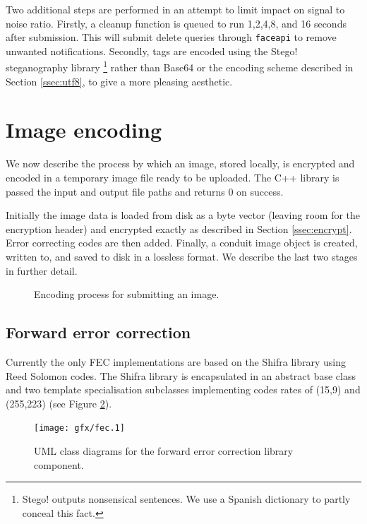 Two additional steps are performed in an attempt to limit impact on signal to noise ratio. Firstly, a cleanup function is queued to run 1,2,4,8, and 16 seconds after submission. This will submit delete queries through {\tt faceapi} to remove unwanted notifications. Secondly, tags are encoded using the Stego! steganography library \footnote{Stego! outputs nonsensical sentences. We use a Spanish dictionary to partly conceal this fact.} rather than Base64 or the encoding scheme described in Section \ref{ssec:utf8}, to give a more pleasing aesthetic.


\FloatBarrier
\section{Image encoding}
\label{sec:img-sub}

We now describe the process by which an image, stored locally, is encrypted and encoded in a temporary image file ready to be uploaded. The C++ library is passed the input and output file paths and returns 0 on success.

Initially the image data is loaded from disk as a byte vector (leaving room for the encryption header) and encrypted exactly as described in Section \ref{ssec:encrypt}. Error correcting codes are then added. Finally, a conduit image object is created, written to, and saved to disk in a lossless format. We describe the last two stages in further detail.

    \begin{figure}[tb]
        \begin{center}
                
            \caption{Encoding process for submitting an image.}
            \label{tikz:text}
        \end{center}
    \end{figure}


\FloatBarrier
\subsection{Forward error correction}

Currently the only FEC implementations are based on the Shifra library using Reed Solomon codes. The Shifra library is encapsulated in an abstract base class and two template specialisation subclasses implementing codes rates of (15,9) and (255,223) (see Figure \ref{uml:fec}).


    \begin{figure}[tb]
        \begin{center}
                \texttt{[image: gfx/fec.1]}
            \caption{UML class diagrams for the forward error correction library component.}
            \label{uml:fec}
        \end{center}
    \end{figure}

